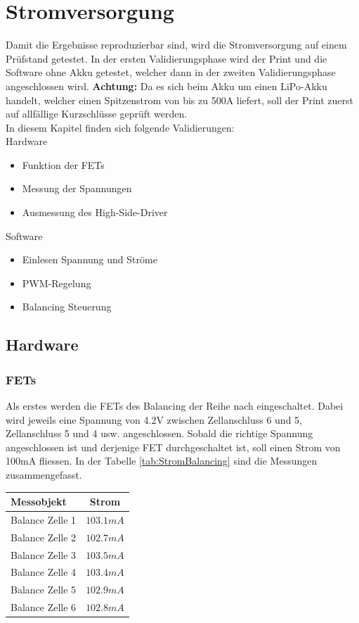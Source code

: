 \section{Stromversorgung} \label{ValidStromversorgung}

Damit die Ergebnisse reproduzierbar sind, wird die Stromversorgung auf einem Prüfstand getestet. In der ersten Validierungsphase wird der Print und die Software ohne Akku getestet, welcher dann in der zweiten Validierungsphase angeschlossen wird. \textbf{Achtung:} Da es sich beim Akku um einen LiPo-Akku handelt, welcher einen Spitzenstrom von bis zu 500A liefert, soll der Print zuerst auf allfällige Kurzschlüsse geprüft werden.   
\\
In diesem Kapitel finden sich folgende Validierungen:\\
Hardware
\begin{itemize}
	\item Funktion der FETs
	\item Messung der Spannungen
	\item Ausmessung des High-Side-Driver
\end{itemize}
Software
\begin{itemize}
	\item Einlesen Spannung und Ströme
	\item PWM-Regelung
	\item Balancing Steuerung
\end{itemize}

\subsection{Hardware}
\subsubsection*{FETs}
Als erstes werden die FETs des Balancing der Reihe nach eingeschaltet. Dabei wird jeweils eine Spannung von 4.2V zwischen Zellanschluss 6 und 5, Zellanschluss 5 und 4 usw. angeschlossen. Sobald die richtige Spannung angeschlossen ist und derjenige FET durchgeschaltet ist, soll einen Strom von 100mA fliessen. In der Tabelle \ref{tab:StromBalancing} sind die Messungen zusammengefasst.

\begin{center}
	\begin{tabular}{l|c}
		Messobjekt & Strom \\ \hline
		Balance Zelle 1 & $103.1mA$ \\ \hline
		Balance Zelle 2 & $102.7mA$ \\ \hline
		Balance Zelle 3 & $103.5mA$ \\ \hline
		Balance Zelle 4 & $103.4mA$ \\ \hline
		Balance Zelle 5 & $102.9mA$ \\ \hline
		Balance Zelle 6 & $102.8mA$ \\ \hline
	\end{tabular} 
	\label{tab:StromBalancing}
\end{center}

